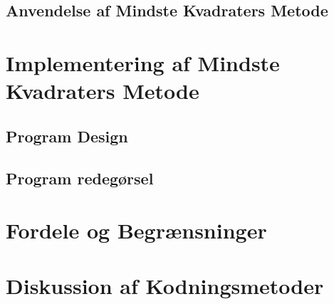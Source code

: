 \subsection{Anvendelse af Mindste Kvadraters Metode}


\section{Implementering af Mindste Kvadraters Metode}


\subsection{Program Design}

\subsection{Program redegørsel}

\section{Fordele og Begrænsninger}

\section{Diskussion af Kodningsmetoder}
